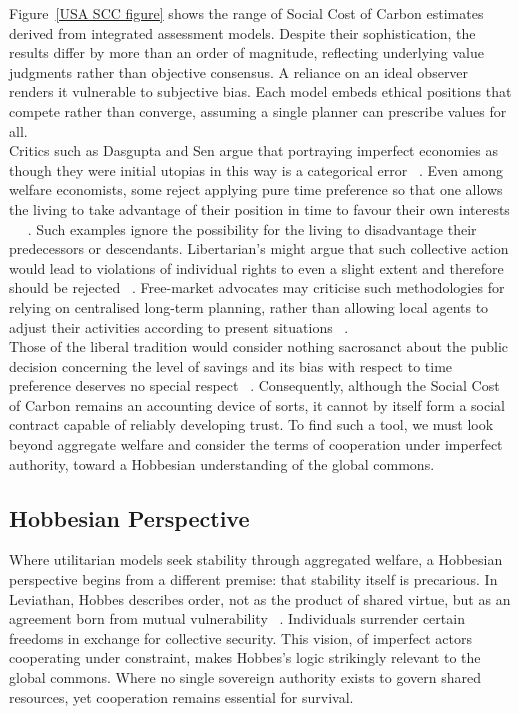 Figure~\ref{USA SCC figure} shows the range of Social Cost of Carbon estimates derived from integrated assessment models.
Despite their sophistication, the results differ by more than an order of magnitude, reflecting underlying value judgments rather than objective consensus.
A reliance on an ideal observer renders it vulnerable to subjective bias.
Each model embeds ethical positions that compete rather than converge, assuming a single planner can prescribe values for all.\\

Critics such as Dasgupta and Sen argue that portraying imperfect economies as though they were initial utopias in this way is a categorical error ~\cite{as1}.
Even among welfare economists, some reject applying pure time preference so that one allows the living to take advantage of their position in time to favour their own interests ~\cite{hs1} ~\cite{fr1}.
Such examples ignore the possibility for the living to disadvantage their predecessors or descendants.
Libertarian's might argue that such collective action would lead to violations of individual rights to even a slight extent and therefore should be rejected ~\cite{rn1}.
Free-market advocates may criticise such methodologies for relying on centralised long-term planning, rather than allowing local agents to adjust their activities according to present situations ~\cite{fh1}.\\

Those of the liberal tradition would consider nothing sacrosanct about the public decision concerning the level of savings and its bias with respect to time preference deserves no special respect ~\cite{jr1}.
Consequently, although the Social Cost of Carbon remains an accounting device of sorts, it cannot by itself form a social contract capable of reliably developing trust.
To find such a tool, we must look beyond aggregate welfare and consider the terms of cooperation under imperfect authority, toward a Hobbesian understanding of the global commons.\\

\subsection{Hobbesian Perspective}

Where utilitarian models seek stability through aggregated welfare, a Hobbesian perspective begins from a different premise: that stability itself is precarious.
In Leviathan, Hobbes describes order, not as the product of shared virtue, but as an agreement born from mutual vulnerability ~\cite{th1}.
Individuals surrender certain freedoms in exchange for collective security.
This vision, of imperfect actors cooperating under constraint, makes Hobbes’s logic strikingly relevant to the global commons.
Where no single sovereign authority exists to govern shared resources, yet cooperation remains essential for survival.\\

